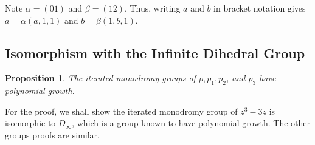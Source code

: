 \documentclass[11pt]{amsart}
\newtheorem{proposition}[theorem]{Proposition}
\theoremstyle{definition}
\theoremstyle{remark}
\numberwithin{equation}{section}
\begin{document}
\indent Note $ \alpha = (0 1)$ and $\beta = (1 2)$. Thus, writing $a$ and $b$ in bracket notation gives $a = \alpha(a, 1, 1)$ and $b = \beta(1, b, 1)$.\\


\subsection{Isomorphism with the Infinite Dihedral Group}

\begin{proposition} \label{Poly}
\indent The iterated monodromy groups of $p,p_1,p_2$, and $p_3$ have polynomial growth. 
\end{proposition}

\indent For the proof, we shall show the iterated monodromy group of $z^3-3z$ is isomorphic to $D_\infty$, which is a group known to have polynomial growth. The other groups proofs are similar.\\
\end{document}
